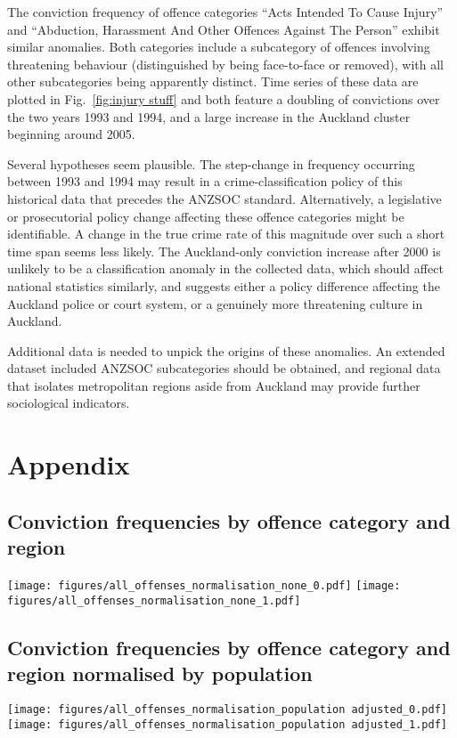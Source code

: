 \documentclass[onecolumn]{myarticle}
\begin{document}
The conviction frequency of offence categories ``Acts Intended To Cause Injury'' and ``Abduction, Harassment And Other Offences Against The Person'' exhibit similar anomalies.
Both categories include a subcategory of offences involving threatening behaviour (distinguished by being face-to-face or removed), with all other subcategories being apparently distinct.
Time series of these data are plotted in Fig.~\ref{fig:injury stuff} and both feature a doubling of convictions over the two years 1993 and 1994, and a large increase in the Auckland cluster beginning around 2005.

Several hypotheses seem plausible.  
The step-change in frequency occurring between 1993 and 1994 may result in a crime-classification policy of this historical data that precedes the ANZSOC standard.
Alternatively, a legislative or prosecutorial policy change affecting these offence categories might be identifiable.
A change in the true crime rate of this magnitude over such a short time span seems less likely.
The Auckland-only conviction increase after 2000 is unlikely to be a classification anomaly in the collected data, which should affect national statistics similarly, and suggests either a policy difference affecting the Auckland police or court system, or a genuinely more threatening culture in Auckland.

Additional data is needed to unpick the origins of these anomalies.
An extended dataset included ANZSOC subcategories should be obtained, and regional data that isolates metropolitan regions aside from Auckland may provide further sociological indicators.

\newpage
\section*{Appendix}
\centering
\subsection*{Conviction frequencies by offence category and region}
\texttt{[image: figures/all\_offenses\_normalisation\_none\_0.pdf]}
\newpage
\texttt{[image: figures/all\_offenses\_normalisation\_none\_1.pdf]}
\newpage

\subsection*{Conviction frequencies by offence category and region normalised by population}
  \texttt{[image: figures/all\_offenses\_normalisation\_population adjusted\_0.pdf]}
\newpage
  \texttt{[image: figures/all\_offenses\_normalisation\_population adjusted\_1.pdf]}
\newpage
\end{document}
